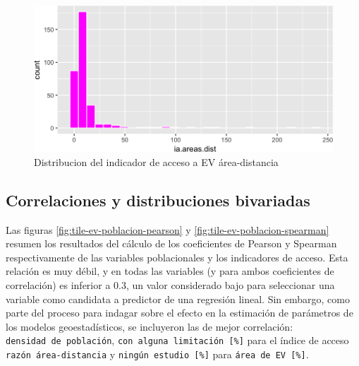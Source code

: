 \documentclass[12pt,a4paper,openany]{book}
\theoremstyle{definition}
\theoremstyle{definition}
\theoremstyle{definition}
\theoremstyle{remark}
\begin{document}
\begin{figure}[H]

{\centering \includegraphics[width=1\linewidth]{tesis-unigis_files/figure-latex/hist-areasdist-1} 

}

\caption{Distribucion del indicador de acceso a EV área-distancia }\label{fig:hist-areasdist}
\end{figure}

\subsection{Correlaciones y distribuciones
bivariadas}\label{correlaciones-y-distribuciones-bivariadas}

Las figuras \ref{fig:tile-ev-poblacion-pearson} y
\ref{fig:tile-ev-poblacion-spearman} resumen los resultados del cálculo
de los coeficientes de Pearson y Spearman respectivamente de las
variables poblacionales y los indicadores de acceso. Esta relación es
muy débil, y en todas las variables (y para ambos coeficientes de
correlación) es inferior a 0.3, un valor considerado bajo para
seleccionar una variable como candidata a predictor de una regresión
lineal. Sin embargo, como parte del proceso para indagar sobre el efecto
en la estimación de parámetros de los modelos geoestadísticos, se
incluyeron las de mejor correlación: \texttt{densidad\ de\ población},
\texttt{con\ alguna\ limitación\ {[}\%{]}} para el índice de acceso
\texttt{razón\ área-distancia} y \texttt{ningún\ estudio\ {[}\%{]}} para
\texttt{área\ de\ EV\ {[}\%{]}}.
\end{document}
